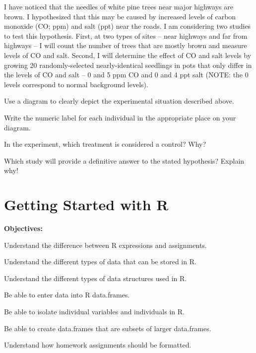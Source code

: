 \documentclass[10pt,openany]{book}\usepackage[]{graphicx}\usepackage[]{color}
\begin{document}
\begin{exsection}
  \item \label{revex:ExpDPine} I have noticed that the needles of white pine trees near major highways are brown.  I hypothesized that this may be caused by increased levels of carbon monoxide (CO; ppm) and salt (ppt) near the roads.  I am considering two studies to test this hypothesis.  First, at two types of sites -- near highways and far from highways -- I will count the number of trees that are mostly brown and measure levels of CO and salt.  Second, I will determine the effect of CO and salt levels by growing 20 randomly-selected nearly-identical seedlings in pots that only differ in the levels of CO and salt -- 0 and 5 ppm CO and 0 and 4 ppt salt (NOTE: the 0 levels correspond to normal background levels). 
\begin{Enumerate}
  \item Use a diagram to clearly depict the experimental situation described above.
  \item \rhw{} Write the numeric label for each individual in the appropriate place on your diagram.
  \item In the experiment, which treatment is considered a control?  Why?
  \item Which study will provide a definitive answer to the stated hypothesis?  Explain why!
\end{Enumerate}

\end{exsection}



\chapter{Getting Started with R} \label{chap:FoundationsR}
\begin{ChapObj}{\boxwidth}
  \textbf{Objectives:}
  \begin{Enumerate}
    \item Understand the difference between R expressions and assignments.
    \item Understand the different types of data that can be stored in R.
    \item Understand the different types of data structures used in R.
    \item Be able to enter data into R data.frames.
    \item Be able to isolate individual variables and individuals in R.
    \item Be able to create data.frames that are subsets of larger data.frames.
    \item Understand how homework assignments should be formatted.
  \end{Enumerate}
\end{ChapObj}
\end{document}
